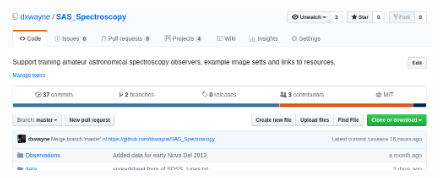 \documentclass[letter,11pt,oneside]{article}
\begin{document}
\begin{figure}[h!]
\centering
\includegraphics[width=\textwidth]{images/GitHubOverview.png}
\caption{} %
\label{figure:}
\end{figure}








\end{document}
